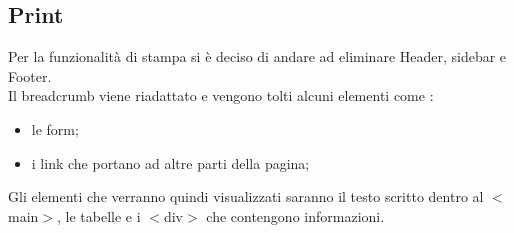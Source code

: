   \subsection{Print}
    Per la funzionalità di stampa si è deciso di andare ad eliminare Header, sidebar e Footer. \\
    Il breadcrumb viene riadattato e vengono tolti alcuni elementi come :
    \begin{itemize}
      \item le form;
      \item i link che portano ad altre parti della pagina;
    \end{itemize}
    Gli elementi che verranno quindi visualizzati saranno il testo scritto dentro al $<$main$>$, le tabelle e i $<$div$>$ che contengono informazioni.